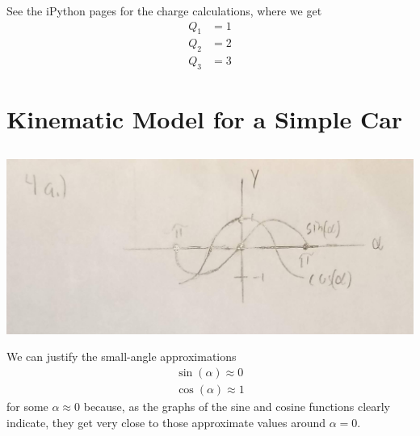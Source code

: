 \documentclass[]{article}
\begin{document}
See the iPython pages for the charge calculations, where we get 
\begin{align}
	Q_1 &= 1 \\
	Q_2 &= 2 \\
	Q_3 &= 3
\end{align}

\section{Kinematic Model for a Simple Car}

\subsection{}

\begin{center}
	\includegraphics[width=0.7\linewidth]{20190913_220943}
\end{center}

We can justify the small-angle approximations
\begin{align}
	\sin(\alpha) \approx 0 \\
	\cos(\alpha) \approx 1
\end{align}
for some \(\alpha \approx 0\) because, as the graphs of the sine and cosine functions clearly indicate, they get very close to those approximate values around \(\alpha = 0\). 

\subsection{}
\end{document}
